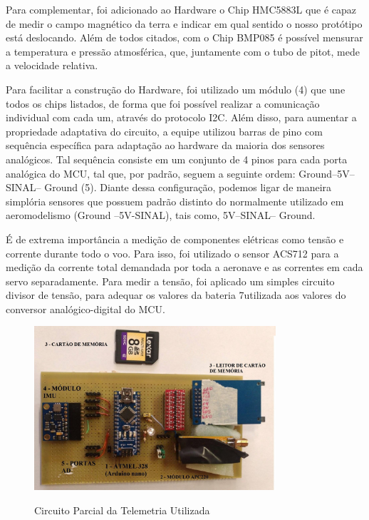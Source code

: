Para complementar, foi adicionado ao Hardware o Chip HMC5883L que é capaz de
medir o campo magnético da terra e indicar em qual sentido o nosso protótipo está deslocando.
Além de todos citados, com o Chip BMP085 é possível mensurar a temperatura e pressão
atmosférica, que, juntamente com o tubo de pitot, mede a velocidade relativa.

Para facilitar a construção do Hardware, foi utilizado um módulo (4) que une todos os
chips listados, de forma que foi possível realizar a comunicação individual com cada um,
através do protocolo I2C. Além disso, para aumentar a propriedade adaptativa do circuito, a
equipe utilizou barras de pino com sequência específica para adaptação ao hardware da maioria
dos sensores analógicos. Tal sequência consiste em um conjunto de 4 pinos para cada porta
analógica do MCU, tal que, por padrão, seguem a seguinte ordem: Ground–5V–SINAL–
Ground (5). Diante dessa configuração, podemos ligar de maneira simplória sensores que
possuem padrão distinto do normalmente utilizado em aeromodelismo (Ground –5V-SINAL),
tais como, 5V–SINAL– Ground.

É de extrema importância a medição de componentes elétricas como tensão e corrente
durante todo o voo. Para isso, foi utilizado o sensor ACS712 para a medição da corrente total
demandada por toda a aeronave e as correntes em cada servo separadamente. Para medir a
tensão, foi aplicado um simples circuito divisor de tensão, para adequar os valores da bateria
7utilizada aos valores do conversor analógico-digital do MCU.

\begin{figure}[h]
    \centering
    \caption{Circuito Parcial da Telemetria Utilizada}
    \includegraphics[width=0.8\textwidth]{./Imagens/Circuito_parcial_da_telemetria}
    \label{fig:telemetria}
\end{figure}

